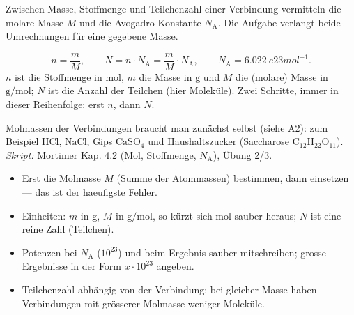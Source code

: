 

Zwischen Masse, Stoffmenge und Teilchenzahl einer Verbindung vermitteln die
molare Masse $M$ und die Avogadro-Konstante $N_\mathrm{A}$. Die Aufgabe verlangt
beide Umrechnungen für eine gegebene Masse.

\begin{werkzeugkasten}
\begin{equation}
  n = \frac{m}{M}, \qquad N = n \cdot N_\mathrm{A}
  = \frac{m}{M}\cdot N_\mathrm{A},
  \qquad N_\mathrm{A} = \qty{6.022}{e23 mol^{-1}}.
\end{equation}
$n$ ist die Stoffmenge in $\mathrm{mol}$, $m$ die Masse in $\mathrm{g}$ und $M$
die (molare) Masse in $\mathrm{g/mol}$; $N$ ist die Anzahl der Teilchen (hier
Moleküle). Zwei Schritte, immer in dieser Reihenfolge: erst $n$, dann $N$.

Molmassen der Verbindungen braucht man zunächst selbst (siehe A2):
zum Beispiel $\mathrm{HCl}$, $\mathrm{NaCl}$, Gips $\mathrm{CaSO_4}$ und
Haushaltszucker (Saccharose $\mathrm{C_{12}H_{22}O_{11}}$).
\textit{Skript:} Mortimer Kap. 4.2 (Mol, Stoffmenge, $N_\mathrm{A}$),
Übung 2/3.
\end{werkzeugkasten}

\begin{achtung}
\begin{itemize}
  \item Erst die Molmasse $M$ (Summe der Atommassen) bestimmen, dann
        einsetzen --- das ist der haeufigste Fehler.
  \item Einheiten: $m$ in $\mathrm{g}$, $M$ in $\mathrm{g/mol}$, so kürzt
        sich $\mathrm{mol}$ sauber heraus; $N$ ist eine reine Zahl (Teilchen).
  \item Potenzen bei $N_\mathrm{A}$ ($10^{23}$) und beim Ergebnis sauber
        mitschreiben; grosse Ergebnisse in der Form $x\cdot10^{23}$ angeben.
  \item Teilchenzahl abhängig von der Verbindung; bei gleicher Masse haben
        Verbindungen mit grösserer Molmasse weniger Moleküle.
\end{itemize}
\end{achtung}
